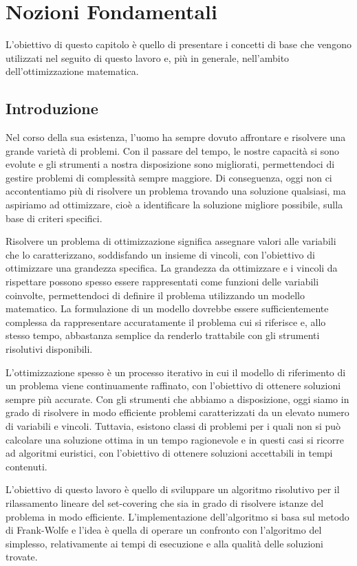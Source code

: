 \chapter{Nozioni Fondamentali}
L'obiettivo di  questo capitolo è quello di presentare i concetti di base che vengono utilizzati nel seguito di questo
lavoro e, più in generale, nell'ambito dell'ottimizzazione matematica.
\section{Introduzione}
Nel corso della sua esistenza, l’uomo ha sempre dovuto affrontare e risolvere una grande varietà di problemi. Con il
passare del tempo, le nostre capacità si sono evolute e gli strumenti a nostra disposizione sono migliorati,
permettendoci di gestire problemi di complessità sempre maggiore. Di conseguenza, oggi non ci accontentiamo più di
risolvere un problema trovando una soluzione qualsiasi, ma aspiriamo ad ottimizzare, cioè a identificare la soluzione
migliore possibile, sulla base di criteri specifici.

Risolvere un problema di ottimizzazione significa assegnare valori alle variabili che lo caratterizzano, soddisfando un
insieme di vincoli, con l'obiettivo di ottimizzare una grandezza specifica. La grandezza da ottimizzare e i vincoli da
rispettare possono spesso essere rappresentati come funzioni delle variabili coinvolte, permettendoci di definire il
problema utilizzando un modello matematico. La formulazione di un modello dovrebbe essere suﬀicientemente complessa da
rappresentare accuratamente il problema cui si riferisce e, allo stesso tempo, abbastanza semplice da renderlo
trattabile con gli strumenti risolutivi disponibili.

L'ottimizzazione spesso è un processo iterativo in cui il modello di riferimento di un problema viene continuamente
raffinato, con l'obiettivo di ottenere soluzioni sempre più accurate.
Con gli strumenti che abbiamo a disposizione, oggi siamo in grado di risolvere in modo efficiente problemi
caratterizzati da un elevato numero di variabili e vincoli. Tuttavia, esistono classi di problemi per i quali non si può
calcolare una soluzione ottima in un tempo ragionevole e in questi casi si ricorre ad algoritmi euristici, con
l'obiettivo di ottenere soluzioni accettabili in tempi contenuti.

L'obiettivo di questo lavoro è quello di sviluppare un algoritmo risolutivo per il rilassamento lineare del set-covering
che sia in grado di risolvere istanze del problema in modo efficiente. L'implementazione dell'algoritmo si basa sul
metodo di Frank-Wolfe e l'idea è quella di operare un confronto con l'algoritmo del simplesso, relativamente ai tempi di
esecuzione e alla qualità delle soluzioni trovate.


